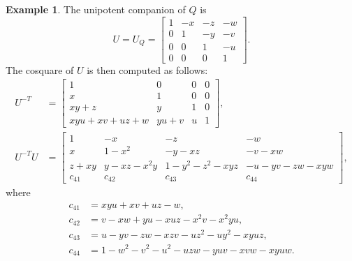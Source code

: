 \documentclass[11pt, letterpaper]{amsart}
\theoremstyle{definition}
\newtheorem{example}[theorem]{Example}
\numberwithin{equation}{section}
\begin{document}
\begin{example}
The unipotent companion of $Q$ is 
\begin{equation*}
U\!=\!U_Q\!=\begin{bmatrix} 
1 & -x & -z & -w \\
0 & 1 & -y & -v\\
0 & 0 & 1 & -u \\
0 & 0 & 0 & 1
\end{bmatrix} . 
\end{equation*}
The cosquare of $U$ is then computed as follows: 
\begin{align*}
U^{-T}&=
\begin{bmatrix} 
1 & 0 & 0 & 0 \\
x & 1 & 0 & 0 \\
xy+z & y& 1 & 0 \\
xyu+xv+uz+w & yu+v & u & 1
\end{bmatrix}, 
\\[5pt]
U^{-T} U %
&=
\begin{bmatrix} %
1 	& 		-x	&		-z		&-w  \\[3pt]
x 	& 		1-x^2	&		-y-xz		&-v-xw\\[3pt]	
z+xy 	& 		y-xz-x^2y &		1-y^2-z^2-xyz	&-u-yv-zw-xyw\\[3pt]	
c_{41} 	& c_{42} & c_{43}	& c_{44} 
\end{bmatrix}\!,
\end{align*}
where
\begin{align*}
c_{41}&=xyu + xv + uz - w, \\ 
c_{42}&=v-xw+yu-xuz-x^2v-x^2yu, \\
c_{43}&=u-yv-zw-xzv-uz^2-uy^2-xyuz, \\
c_{44}&=1-w^2-v^2-u^2-uzw-yuv-xvw-xyuw. 
\end{align*}
\end{example}
\end{document}
